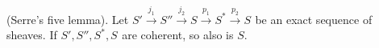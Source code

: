 (Serre's five lemma). Let $S' \xrightarrow{j_1} S'' \xrightarrow{j_2} S \xrightarrow{p_1} S^* \xrightarrow{p_2} S^{}$ be an exact sequence of sheaves. If $S', S'', S^*, S^{}$ are coherent, so also is $S$.
